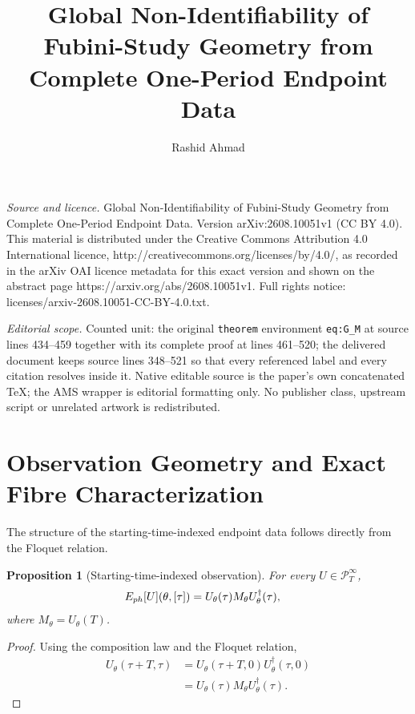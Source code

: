 \documentclass[10pt,a4paper]{amsart}
\newtheorem{proposition}{Proposition}
\begin{document}
\title[Global Non-Identifiability of Fubini-Study Geometry from Com]{Global Non-Identifiability of Fubini-Study Geometry from Complete One-Period Endpoint Data}
\author{Rashid Ahmad}
\date{}
\maketitle
\noindent\emph{Source and licence.} Global Non-Identifiability of Fubini-Study Geometry from Complete One-Period Endpoint Data. Version arXiv:2608.10051v1 (CC BY 4.0). This material is distributed under the Creative Commons Attribution 4.0 International licence, http://creativecommons.org/licenses/by/4.0/, as recorded in the arXiv OAI licence metadata for this exact version and shown on the abstract page https://arxiv.org/abs/2608.10051v1. Full rights notice: licenses/arxiv-2608.10051-CC-BY-4.0.txt.\par\smallskip
\noindent\textit{Editorial scope.} Counted unit: the original \texttt{theorem} environment \texttt{eq:G\_M} at source lines 434--459 together with its complete proof at lines 461--520; the delivered document keeps source lines 348--521 so that every referenced label and every citation resolves inside it. Native editable source is the paper's own concatenated TeX; the AMS wrapper is editorial formatting only. No publisher class, upstream script or unrelated artwork is redistributed.
\section{Observation Geometry and Exact Fibre Characterization}

The structure of the starting-time-indexed endpoint data follows directly from the Floquet relation.

\begin{proposition}[Starting-time-indexed observation]
For every $U\in\mathcal P_T^\infty$,
\begin{align}
E_{\rm ph}[U](\theta,[\tau])
&=
U_\theta(\tau)M_\theta U_\theta^\dagger(\tau),
\label{eq:orbit_observation}
\end{align}
where $M_\theta=U_\theta(T)$.
\end{proposition}

\begin{proof}
Using the composition law and the Floquet relation,
\begin{align}
U_\theta(\tau+T,\tau)
&=
U_\theta(\tau+T,0)
U_\theta^\dagger(\tau,0)
\nonumber\\
&=
U_\theta(\tau)M_\theta
U_\theta^\dagger(\tau).
\end{align}
\end{proof}
\end{document}
